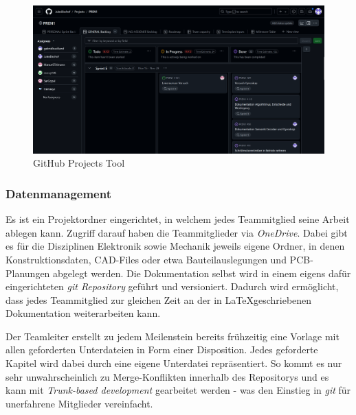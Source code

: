 \documentclass[main.tex]{subfiles} %
\begin{document}
\begin{figure}[h!]
    \centering
    \includegraphics[page=1, width=1\textwidth]{./fig_Projektmanagement/Ansicht_GitHubProjects.png}
    \caption{GitHub Projects Tool}\label{fig:GitHubProjectsTool}
\end{figure}

\subsubsection*{Datenmanagement}
Es ist ein Projektordner eingerichtet, in welchem jedes Teammitglied seine Arbeit ablegen kann. Zugriff darauf
haben die Teammitglieder via \textit{OneDrive}.
Dabei gibt es für die Disziplinen Elektronik sowie Mechanik jeweils eigene Ordner, in denen Konstruktionsdaten,
CAD-Files oder etwa Bauteilauslegungen und PCB-Planungen abgelegt werden. Die Dokumentation
selbst wird in einem eigens dafür eingerichteten \textit{git Repository} geführt und versioniert.
Dadurch wird ermöglicht, dass jedes Teammitglied zur gleichen Zeit an der in \LaTeX geschriebenen
Dokumentation weiterarbeiten kann.

Der Teamleiter erstellt zu jedem Meilenstein bereits frühzeitig eine Vorlage
mit allen geforderten Unterdateien in Form einer Disposition. Jedes geforderte
Kapitel wird dabei durch eine eigene Unterdatei repräsentiert. So kommt es nur
sehr unwahrscheinlich zu Merge-Konflikten innerhalb des Repositorys und es kann
mit \textit{Trunk-based development} gearbeitet werden - was den Einstieg in
\textit{git} für unerfahrene Mitglieder vereinfacht.
\end{document}
